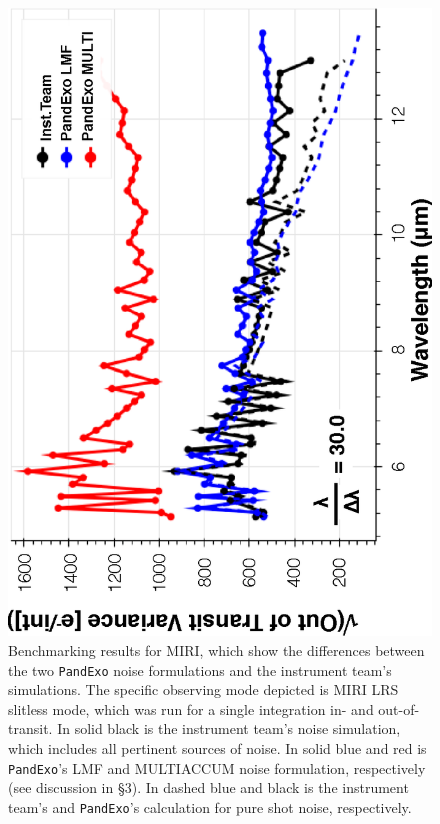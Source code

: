 \documentclass[iop]{emulateapj}
\begin{document}
\begin{figure}[ht]
 \includegraphics[angle=270,origin=c,width=\linewidth]{fig8.eps}
\caption{Benchmarking results for MIRI, which show the differences between the two \texttt{PandExo} noise formulations and the instrument team's simulations. The specific observing mode depicted is MIRI LRS slitless mode, which was run for a single integration in- and out-of-transit. In solid black is the instrument team's noise simulation, which includes all pertinent sources of noise. In solid blue and red is \texttt{PandExo}'s LMF and MULTIACCUM noise formulation, respectively (see discussion in \S3). In dashed blue and black is the instrument team's and \texttt{PandExo}'s calculation for pure shot noise, respectively. \label{fig8}}
\end{figure}
\end{document}
